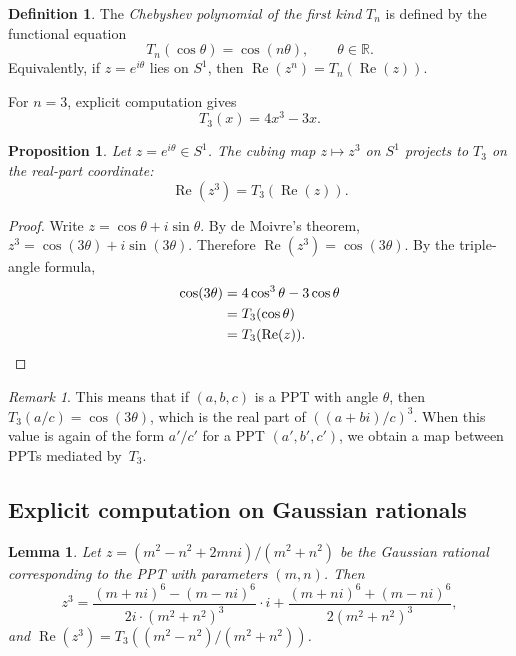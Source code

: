 \documentclass[12pt]{amsart}
\newtheorem{lemma}[theorem]{Lemma}
\newtheorem{proposition}[theorem]{Proposition}
\theoremstyle{definition}
\newtheorem{definition}[theorem]{Definition}
\theoremstyle{remark}
\newtheorem{remark}[theorem]{Remark}
\newcommand{\RR}{\mathbb{R}}
\DeclareMathOperator{\re}{Re}
\begin{document}
\begin{definition}\label{def:chebyshev}
The \emph{Chebyshev polynomial of the first kind} $T_n$ is defined by
the functional equation
\begin{equation}\label{eq:cheb-def}
  T_n(\cos\theta) = \cos(n\theta), \qquad \theta\in\RR.
\end{equation}
Equivalently, if $z = e^{i\theta}$ lies on $S^1$, then
$\re(z^n) = T_n(\re(z))$.
\end{definition}

For $n=3$, explicit computation gives
\begin{equation}\label{eq:T3}
  T_3(x) = 4x^3 - 3x.
\end{equation}

\begin{proposition}\label{prop:cubing}
Let $z = e^{i\theta}\in S^1$.  The cubing map $z\mapsto z^3$ on $S^1$
projects to $T_3$ on the real-part coordinate:
\[
  \re(z^3) = T_3(\re(z)).
\]
\end{proposition}

\begin{proof}
Write $z = \cos\theta + i\sin\theta$.  By de Moivre's theorem,
$z^3 = \cos(3\theta) + i\sin(3\theta)$.  Therefore
$\re(z^3) = \cos(3\theta)$.  By the triple-angle formula,
\begin{align*}
  \cos(3\theta)
    &= 4\cos^3\theta - 3\cos\theta \\
    &= T_3(\cos\theta) \\
    &= T_3(\re(z)). \qedhere
\end{align*}
\end{proof}

\begin{remark}
This means that if $(a,b,c)$ is a PPT with angle $\theta$,
then $T_3(a/c) = \cos(3\theta)$, which is the real part of
$((a+bi)/c)^3$.  When this value is again of the form $a'/c'$
for a PPT $(a',b',c')$, we obtain a map between PPTs mediated by~$T_3$.
\end{remark}

\subsection{Explicit computation on Gaussian rationals}

\begin{lemma}\label{lem:cube-gaussian}
Let $z = (m^2-n^2 + 2mni)/(m^2+n^2)$ be the Gaussian rational
corresponding to the PPT with parameters $(m,n)$.  Then
\[
  z^3 = \frac{(m+ni)^6 - (m-ni)^6}{2i \cdot (m^2+n^2)^3}
       \cdot i + \frac{(m+ni)^6 + (m-ni)^6}{2(m^2+n^2)^3},
\]
and $\re(z^3) = T_3((m^2-n^2)/(m^2+n^2))$.
\end{lemma}
\end{document}
